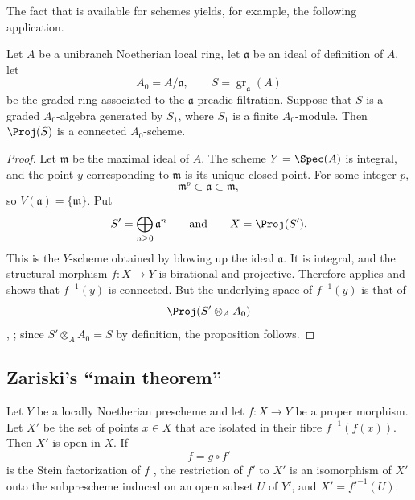 The fact that  is available for schemes yields, for
example, the following application.

\begin{proposition}[4.3.13]
\label{III.4.3.13}
Let $A$ be a unibranch Noetherian local ring, let $\mathfrak{a}$ be
an ideal of definition of $A$, let
\[
  A_0=A/\mathfrak{a},
  \qquad
  S=\operatorname{gr}_{\mathfrak{a}}(A)
\]
be the graded ring associated to the $\mathfrak{a}$-preadic
filtration.  Suppose that $S$ is a graded $A_0$-algebra generated by
$S_1$, where $S_1$ is a finite $A_0$-module.  Then $\Proj(S)$ is a
connected $A_0$-scheme.
\end{proposition}

\begin{proof}
Let $\mathfrak{m}$ be the maximal ideal of $A$.  The scheme
$Y=\Spec(A)$ is integral, and the point $y$ corresponding to
$\mathfrak{m}$ is its unique closed point.  For some integer $p$,
\[
  \mathfrak{m}^p\subset\mathfrak{a}\subset\mathfrak{m},
\]
so $V(\mathfrak{a})=\{\mathfrak{m}\}$.  Put
\[
  S'=\bigoplus_{n\geq0}\mathfrak{a}^n
  \qquad\text{and}\qquad
  X=\Proj(S').
\]
This is the $Y$-scheme obtained by blowing up the ideal
$\mathfrak{a}$.  It is integral, and the structural morphism
$f:X\to Y$ is birational  and projective.
Therefore  applies and shows that $f^{-1}(y)$ is
connected.  But the underlying space of $f^{-1}(y)$ is that of
\[
  \Proj(S'\otimes_A A_0)
\]
, ; since
$S'\otimes_AA_0=S$ by definition, the proposition follows.
\end{proof}


\subsection{Zariski's ``main theorem''}
\label{subsection:III.4.4}

\begin{proposition}[4.4.1]
\label{III.4.4.1}
Let $Y$ be a locally Noetherian prescheme and let $f:X\to Y$ be a
proper morphism.  Let $X'$ be the set of points $x\in X$ that are
isolated in their fibre $f^{-1}(f(x))$.  Then $X'$ is open in $X$.
If
\[
  f=g\circ f'
\]
is the Stein factorization of $f$ , the restriction
of $f'$ to $X'$ is an isomorphism of $X'$ onto the subprescheme
induced on an open subset $U$ of $Y'$, and
$X'=f'^{-1}(U)$.
\end{proposition}

